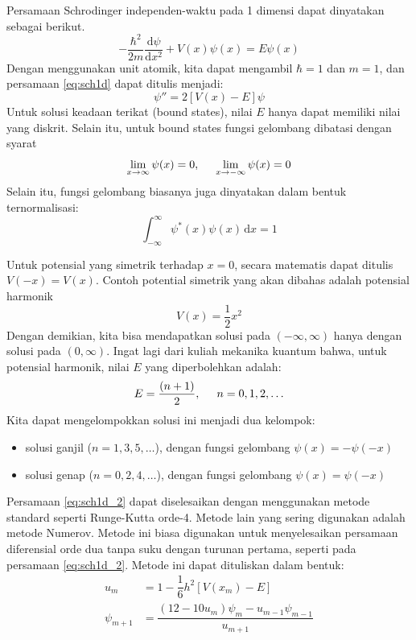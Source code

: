 \documentclass[12pt,bahasa]{article}
\begin{document}
Persamaan Schrodinger independen-waktu pada 1 dimensi
dapat dinyatakan sebagai berikut.
\begin{equation}
-\frac{\hbar^2}{2m}\frac{\mathrm{d}\psi}{\mathrm{d}x^2}
+ V(x)\psi(x) = E\psi(x)
\label{eq:sch1d}
\end{equation}
Dengan menggunakan unit atomik, kita dapat mengambil $\hbar = 1$
dan $m = 1$, dan persamaan \eqref{eq:sch1d} dapat ditulis menjadi:
\begin{equation}
\psi'' = 2\left[ V(x) - E \right]\psi
\label{eq:sch1d_2}
\end{equation}
Untuk solusi keadaan terikat (bound states), nilai $E$ hanya dapat memiliki
nilai yang diskrit. Selain itu, untuk bound states
fungsi gelombang dibatasi dengan syarat
\begin{equation}
\lim_{x\rightarrow\infty} \psi(x) = 0,\hspace{0.5cm}\lim_{x\rightarrow-\infty} \psi(x) = 0
\end{equation}
Selain itu, fungsi gelombang biasanya juga dinyatakan dalam bentuk ternormalisasi:
\begin{equation}
\int_{-\infty}^{\infty} \psi^{*}(x) \psi(x)\,\mathrm{d}x = 1
\end{equation}

Untuk potensial yang simetrik terhadap $x=0$, secara matematis dapat ditulis
$V(-x) = V(x)$. Contoh potential simetrik yang akan dibahas adalah potensial harmonik
\begin{equation}
V(x) = \frac{1}{2}x^2
\end{equation}
Dengan demikian, kita bisa mendapatkan solusi pada $(-\infty,\infty)$ hanya dengan
solusi pada $(0,\infty)$.
Ingat lagi dari kuliah mekanika kuantum bahwa,
untuk potensial harmonik, nilai $E$ yang diperbolehkan adalah:
\begin{equation}
E = \frac{(n + 1)}{2}, \hspace{0.5cm} n = 0,1,2,\ldots
\end{equation}
Kita dapat mengelompokkan solusi ini menjadi dua kelompok:
\begin{itemize}
\item solusi ganjil ($n = 1, 3, 5, \ldots$), dengan fungsi gelombang
$\psi(x) = -\psi(-x)$
\item solusi genap ($n = 0, 2, 4, \ldots$), dengan fungsi gelombang
$\psi(x) = \psi(-x)$
\end{itemize}

Persamaan \eqref{eq:sch1d_2} dapat diselesaikan dengan
menggunakan metode standard seperti Runge-Kutta
orde-4. Metode lain yang sering digunakan adalah metode Numerov. Metode ini biasa
digunakan untuk menyelesaikan persamaan diferensial orde dua tanpa suku dengan turunan
pertama, seperti pada persamaan \eqref{eq:sch1d_2}.
Metode ini dapat dituliskan dalam bentuk:
\begin{align}
u_{m} & = 1 - \dfrac{1}{6}h^2 \left[ V(x_m) - E \right] \\
\psi_{m+1} & = \dfrac{\left(12 - 10u_{m}\right)\psi_{m} - u_{m-1}\psi_{m-1}}{u_{m+1}}
\end{align}
\end{document}
